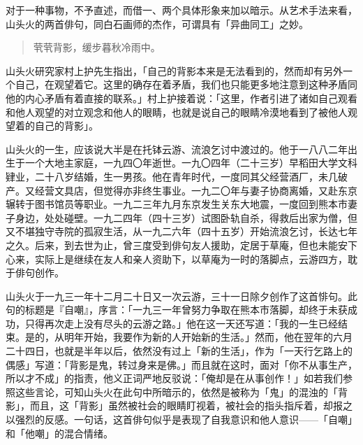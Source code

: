 {    对于一种事物，不予直述，而借一、两个具体形象来加以暗示。从艺术手法来看，山头火的两首俳句，同白石画师的杰作，可谓具有「异曲同工」之妙。

    \begin{quote}
        茕茕背影，缓步暮秋冷雨中。
    \end{quote}

    山头火研究家村上护先生指出，「自己的背影本来是无法看到的，然而却有另外一个自己，在观望着它。这里的确存在着矛盾，我们也只能更多地注意到这种矛盾同他的内心矛盾有着直接的联系。」村上护接着说：「这里，作者引进了诸如自己观看和他人观望的对立观念和他人的眼睛，也就是说自己的眼睛冷漠地看到了被他人观望着的自己的背影」\footnotemark[7]。


    山头火的一生，应该说大半是在托钵云游、流浪乞讨中渡过的。他于一八八二年出生于一个大地主家庭，一九四〇年逝世。一九〇四年（二十三岁）早稻田大学文科肄业，二十八岁结婚，生一男孩。他在青年时代，一度同其父经营酒厂，未几破产。又经营文具店，但觉得亦非终生事业。一九二〇年与妻子协商离婚，又赴东京辗转于图书馆员等职业。一九二三年九月东京发生关东大地震，一度回到熊本市妻子身边，处处碰壁。一九二四年（四十三岁）试图卧轨自杀，得救后出家为僧，但又不堪独守寺院的孤寂生活，从一九二六年（四十五岁）开始流浪乞讨，长达七年之久。后来，到去世为止，曾三度受到俳句友人援助，定居于草庵，但也未能安下心来，实际上是继续在友人和亲人资助下，以草庵为一时的落脚点，云游四方，耽于俳句创作。

    山头火于一九三一年十二月二十日又一次云游，三十一日除夕创作了这首悱句。此句的标题是『自嘲』，序言：「一九三一年曾努力争取在熊本市落脚，却终于未获成功，只得再次走上没有尽头的云游之路。」他在这一天还写道：「我的一生已经结束。是的，从明年开始，我要作为新的人开始新的生活。」\footnotemark[8]然而，他在翌年的六月二十四日，也就是半年以后，依然没有过上「新的生活」，作为「一天行乞路上的偶感」写道：「背影是鬼，转过身来是佛。」\footnotemark[9]而且就在这时，面对「你不从事生产，所以才不成」的指责，他义正词严地反驳说：「俺却是在从事创作！」如若我们参照这些言论，可知山头火在此句中所暗示的，依然是被称为「鬼」的混浊的「背影」，而且，这「背影」虽然被社会的眼睛盯视着，被社会的指头指斥着，却报之以强烈的反感。一句话，这首俳句似乎是表现了自我意识和他人意识——「自嘲」和「他嘲」的混合情绪。


}

